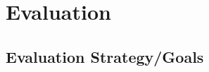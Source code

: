 \documentclass[msc,oneside]{ubcthesis}
\begin{document}


\chapter{Evaluation}

\section{Evaluation Strategy/Goals}

\end{document}
